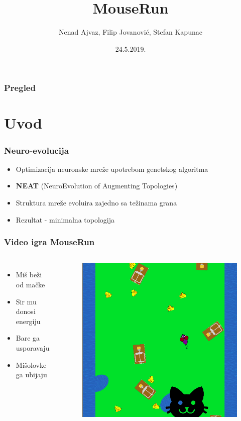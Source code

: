 \documentclass{beamer}
\title[NEAT]{MouseRun}
\author{Nenad Ajvaz, Filip Jovanović, Stefan Kapunac}
\institute[MATF]
{
Univerzitet u Beogradu, Matematički fakultet \\
\medskip
}
\date{24.5.2019.}
\begin{document}
\begin{frame}
\titlepage
\end{frame}

\begin{frame}
\frametitle{Pregled}
\tableofcontents
\end{frame}


\section{Uvod}
\begin{frame} 
\frametitle{Neuro-evolucija}
\begin{itemize}
\item Optimizacija neuronske mreže upotrebom genetskog algoritma
\item \textbf{NEAT} (NeuroEvolution of Augmenting Topologies)
\item Struktura mreže evoluira zajedno sa težinama grana
\item Rezultat - minimalna topologija
\end{itemize}
\end{frame}


\begin{frame} 
\frametitle{Video igra MouseRun}
\begin{columns}[c]
\begin{itemize}
\item Miš beži od mačke
\item Sir mu donosi energiju 
\item Bare ga usporavaju
\item Mišolovke ga ubijaju
\end{itemize}

\begin{figure}
\includegraphics[width=1\linewidth]{images/mouse_run_1.png}
\end{figure}

\end{columns}
\end{frame}
\end{document}
